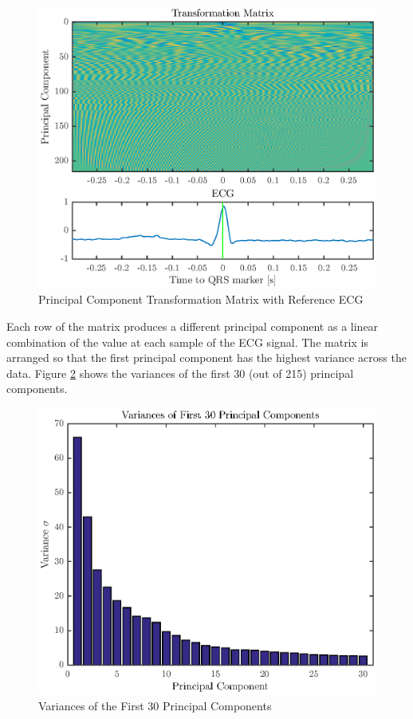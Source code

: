 \documentclass[titlepage,12pt,letter]{article}
\begin{document}
\begin{figure}[htbp]
    \centering
    \includegraphics[height=0.42\textheight]{../figures/train_01}
    \caption{Principal Component Transformation Matrix with Reference ECG}
    \label{fig:transform}
\end{figure}

Each row of the matrix produces a different principal component as a linear
combination of the value at each sample of the ECG signal.  The matrix is
arranged so that the first principal component has the highest variance across
the data.  Figure \ref{fig:var} shows the variances of the first 30 (out of 215)
principal components.  

\begin{figure}[htbp]
    \centering
    \includegraphics[height=0.42\textheight]{../figures/train_02}
    \caption{Variances of the First 30 Principal Components}
    \label{fig:var}
\end{figure}
\end{document}
